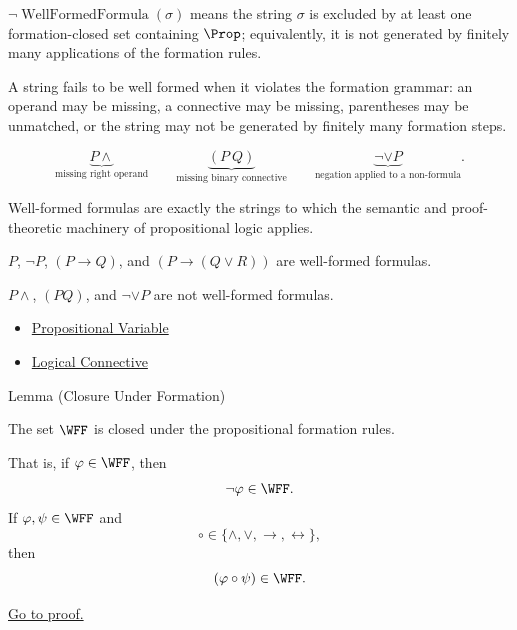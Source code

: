 \begin{remark*}
\(\neg \operatorname{WellFormedFormula}(\sigma)\) means the string \(\sigma\) is excluded by at least one formation-closed set containing \(\Prop\); equivalently, it is not generated by finitely many applications of the formation rules.
\end{remark*}

\begin{remark*}
A string fails to be well formed when it violates the formation grammar: an
operand may be missing, a connective may be missing, parentheses may be
unmatched, or the string may not be generated by finitely many formation steps.
\end{remark*}

\begin{remark*}
\[
\underbrace{P\land}_{\text{missing right operand}}
\qquad
\underbrace{(P\ Q)}_{\text{missing binary connective}}
\qquad
\underbrace{\neg\lor P}_{\text{negation applied to a non-formula}}.
\]
\end{remark*}

\begin{remark*}[Interpretation]
Well-formed formulas are exactly the strings to which the semantic and proof-theoretic machinery of propositional logic applies.
\end{remark*}

\begin{remark*}[Examples]
\(P\), \(\neg P\), \((P\to Q)\), and \((P\to(Q\lor R))\) are well-formed formulas.
\end{remark*}

\begin{remark*}
\(P\land\), \((P Q)\), and \(\neg\lor P\) are not well-formed formulas.
\end{remark*}

\begin{dependencies}
\begin{itemize}
  \item \hyperref[def:propositional-variable]{Propositional Variable}
  \item \hyperref[def:logical-connective]{Logical Connective}
\end{itemize}
\end{dependencies}
\begin{lemmabox}{Lemma (Closure Under Formation)}
\begin{lemma}
\label{lem:closure-under-formation-propositional-formulas}
The set \(\WFF\) is closed under the propositional formation rules.

That is, if \(\varphi\in\WFF\), then
\[
\neg\varphi\in\WFF.
\]
If \(\varphi,\psi\in\WFF\) and
\[
\circ\in\{\land,\lor,\to,\leftrightarrow\},
\]
then
\[
(\varphi\circ\psi)\in\WFF.
\]

\noindent\hyperref[prf:closure-under-formation-propositional-formulas]{Go to proof.}
\end{lemma}
\end{lemmabox}

